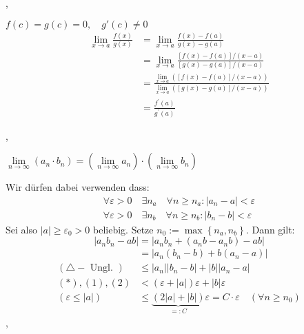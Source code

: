 \sep

\Beweis[Hôpital] $f(c) = g(c) = 0, \quad g'(c) \neq 0$
\begin{align*}
\lim _{x \rightarrow a} \frac{f(x)}{g(x)} &=\lim _{x \rightarrow a} \frac{f(x)-f(a)}{g(x)-g(a)} \\
&=\lim _{x \rightarrow a} \frac{[f(x)-f(a)] /(x-a)}{[g(x)-g(a)] /(x-a)} \\
&=\frac{\lim _{x \rightarrow a}([f(x)-f(a)] /(x-a))}{\lim _{x \rightarrow a}([g(x)-g(a)] /(x-a))} \\
&=\frac{f^{\prime}(a)}{g^{\prime}(a)}
\end{align*}

\sep

\Beweis $\lim \limits_{n \rightarrow \infty} (a_n \cdot b_n) = (\lim \limits_{n \rightarrow \infty} a_n) \cdot (\lim \limits_{n \rightarrow \infty}  b_n)$

Wir dürfen dabei verwenden dass:
\[
\begin{array}{l}
\forall \varepsilon>0 \quad \exists n_{a} \quad \forall n \geq n_{a}:\left|a_{n}-a\right|<\varepsilon \\
\forall \varepsilon>0 \quad \exists n_{b} \quad \forall n \geq n_{b}:\left|b_{n}-b\right|<\varepsilon
\end{array}
\]
Sei also $|a| \geq \varepsilon_{0}>0$ beliebig. Setze $n_{0}:=\max \left\{n_{a}, n_{b}\right\} .$ Dann gilt:
\[
\left|a_{n} b_{n}-a b\right|=\left|a_{n} b_{n}+\left(a_{n} b-a_{n} b\right)-a b\right|
\]
\[
\begin{aligned}
&=\left|a_{n}\left(b_{n}-b\right)+b\left(a_{n}-a\right)\right| \\
(\triangle-\text { Ungl. }) & \leq\left|a_{n}\right|\left|b_{n}-b\right|+|b|\left|a_{n}-a\right| \\
(*),(1),(2) &<(\varepsilon+|a|) \varepsilon+|b| \varepsilon \\
(\varepsilon \leq|a|) & \leq \underbrace{(2|a|+|b|)}_{=: C} \varepsilon=C \cdot \varepsilon \quad\left(\forall n \geq n_{0}\right)
\end{aligned}
\]
\sep